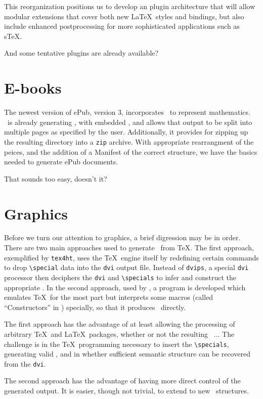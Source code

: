 \documentclass{llncs}
\def\ebooks{\mbox{E-books}\xspace}
\begin{document}
This reorganization positions us to develop an 
plugin architecture that will allow modular extensions
that cover both new \LaTeX\ styles and bindings, but also
include enhanced postprocessing for more sophisticated applications
such as s\TeX.

And some tentative plugins are already available?

\section{\ebooks}\label{ebooks}
The newest version of ePub, version 3, incorporates \MathML\
to represent mathematics.  \LaTeXML\ is already generating \HTML,
with embedded \MathML, and allows that output to be split into
multiple pages as specified by the user. Additionally, it
provides for zipping up the resulting directory into a \texttt{zip}
archive.  With appropriate rearrangment of the peices,
and the addition of a Manifest of the correct structure,
we have the basics needed to generate ePub documents.

That sounds too easy, doesn't it?

\section{Graphics}\label{graphics}
Before we turn our attention to graphics,
a brief digression may be in order.
There are two main approaches used to generate
\HTML\ from \TeX. The first approach,
exemplified by \texttt{tex4ht}, uses the \TeX\ engine
itself by redefining certain commands to drop
\verb|\special| data into the \texttt{dvi} output file.
Instead of \texttt{dvips}, a special \texttt{dvi} processor then deciphers
the \texttt{dvi} and \verb|\specials|
to infer and construct the appropriate \HTML.
In the second approach, used by \LaTeXML, a program
is developed which emulates \TeX\ for the most part
but interprets some macros (called ``Constructors'' in \LaTeXML)
specially, so that it produces \XML\ directly.

The first approach has the advantage of at least
allowing the processing of arbitrary \TeX\ and \LaTeX\ packages,
whether or not the resulting \HTML\ ...
The challenge is in the \TeX\ programming necessary to
insert the \verb|\specials|, generating valid \HTML,
and in whether sufficient semantic structure can be
recovered from the \texttt{dvi}.

The second approach has the advantage of having more
direct control of the generated output.
It is easier, though not trivial, to extend to new
\XML\ structures.
\end{document}
